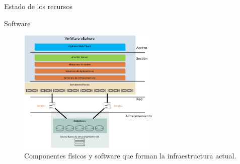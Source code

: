 \begin{chapter}{Estado de los recursos}
\begin{section}{Software}
\begin{itemize}
        
    \end{itemize}
\end{section}

\begin{figure}[hp]
    \centering
    \includegraphics[width=0.6\textwidth]{imaxes/cap2recursos/recursosReal.png}
    \caption{Componentes físicos y software que forman la infraestructura actual.}
    \label{fig:infrastructure-components-production}
\end{figure}
\FloatBarrier


\end{chapter}
